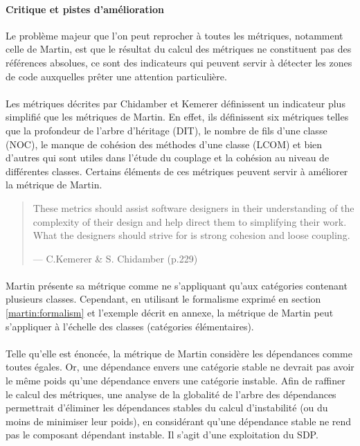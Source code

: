 \documentclass{scrartcl}
\begin{document}
    \paragraph{Critique et pistes d'amélioration}Le problème majeur que l'on peut reprocher à toutes les métriques, notamment celle de Martin, est que le résultat du calcul des métriques ne constituent pas des références absolues, ce sont des indicateurs qui peuvent servir à détecter les zones de code auxquelles prêter une attention particulière.
    

    \paragraph{}Les métriques décrites par Chidamber et Kemerer\cite{ChidamberKemerer:1994} définissent un  indicateur plus simplifié que les métriques de Martin. En effet, ils définissent six métriques telles que la profondeur de l'arbre d'héritage (DIT), le nombre de fils d'une classe (NOC), le manque de cohésion des méthodes d'une classe (LCOM) et bien d'autres qui sont utiles dans l'étude du couplage et la cohésion au niveau de différentes classes. Certains éléments de ces métriques peuvent servir à améliorer la métrique de Martin.
    
    \begin{quote}
        These metrics should assist software designers in their understanding of the complexity of their design and help direct them to simplifying their work. What the designers should strive for is strong cohesion and loose coupling.
        \begin{flushright}--- C.Kemerer \& S. Chidamber \cite{ChidamberKemerer:1994} (p.229)\end{flushright}
    \end{quote}
    
    \paragraph{}Martin présente sa métrique comme ne s'appliquant qu'aux catégories contenant plusieurs classes. Cependant, en utilisant le formalisme exprimé en section \ref{martin:formalism} et l'exemple décrit en annexe, la métrique de Martin peut s'appliquer à l'échelle des classes (catégories élémentaires).
    
    \paragraph{}Telle qu'elle est énoncée, la métrique de Martin considère les dépendances comme toutes égales. Or, une dépendance envers une catégorie stable ne devrait pas avoir le même poids qu'une dépendance envers une catégorie instable. Afin de raffiner le calcul des métriques, une analyse de la globalité de l'arbre des dépendances permettrait d'éliminer les dépendances stables du calcul d'instabilité (ou du moins de minimiser leur poids), en considérant qu'une dépendance stable ne rend pas le composant dépendant instable. Il s'agit d'une exploitation du SDP.
\end{document}

